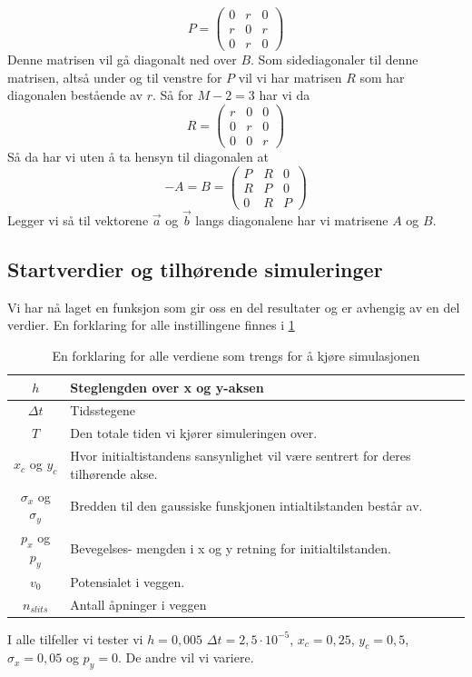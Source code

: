 \documentclass[reprint,english,notitlepage]{revtex4-2}  %
\begin{document}
$$
P=\begin{pmatrix}
	0 &r&0\\
	r &0 &r \\
	0 & r& 0
\end{pmatrix}
$$
Denne matrisen vil gå diagonalt ned over $B$. Som sidediagonaler til denne matrisen, altså under og til venstre for $P$ vil vi har matrisen $R$ som har diagonalen bestående av $r$. Så for $M-2=3$ har vi da
$$
R=\begin{pmatrix}
	r&0&0 \\
	0&r&0 \\
	0&0&r
\end{pmatrix}
$$
Så da har vi uten å ta hensyn til diagonalen at
$$
-A=B=\begin{pmatrix}
	P&R&0 \\
	R&P&0 \\
	0&R&P
\end{pmatrix}
$$
Legger vi så til vektorene $\vec{a}$ og $\vec{b}$ langs diagonalene har vi matrisene $A$ og $B$.
\subsection{Startverdier og tilhørende simuleringer}
Vi har nå laget en funksjon som gir oss en del resultater og er avhengig av en del verdier. En forklaring for alle instillingene finnes i \ref{table:Initverdier}
\begin{table}[H]
\centering
	\begin{tabular}{|c|p{40mm}|}
		\hline
		$h$ & Steglengden over x og y-aksen \\\hline 
		$\Delta t$ & Tidsstegene \\\hline 
		$T$ & Den totale tiden vi kjører simuleringen over. \\\hline
		$x_c$ og $y_c$ & Hvor initialtistandens sansynlighet vil være sentrert for deres tilhørende akse. \\\hline 
		$\sigma_x$ og $\sigma_y$ & Bredden til den gaussiske funskjonen intialtilstanden består av. \\\hline 
		$p_x$ og $p_y$ & Bevegelses- mengden i x og y retning for initialtilstanden. \\\hline 
		$v_0$ & Potensialet i veggen. \\\hline
		$n_{slits}$ & Antall åpninger i veggen \\\hline
	\end{tabular}
\caption{En forklaring for alle verdiene som trengs for å kjøre simulasjonen}
\label{table:Initverdier}
\end{table}
I alle tilfeller vi tester vi $h=0,005$ $\Delta t=2,5\cdot 10^{-5}$, $x_c=0,25$, $y_c=0,5$, $\sigma_x=0,05$ og $p_y=0$. De andre vil vi variere.
\end{document}
